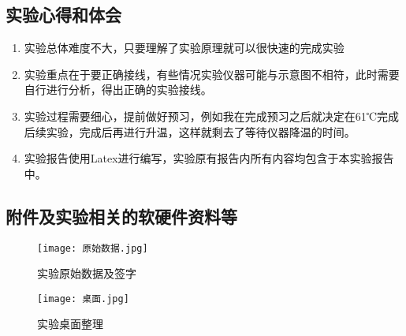 \documentclass[dvipsnames, svgnames,a4paper,11pt]{article}
\begin{document}
	\subsection{实验心得和体会}
	\begin{enumerate}
		\item 实验总体难度不大，只要理解了实验原理就可以很快速的完成实验
		\item 实验重点在于要正确接线，有些情况实验仪器可能与示意图不相符，此时需要自行进行分析，得出正确的实验接线。
		\item 实验过程需要细心，提前做好预习，例如我在完成预习之后就决定在61℃完成后续实验，完成后再进行升温，这样就剩去了等待仪器降温的时间。
		\item 实验报告使用Latex进行编写，实验原有报告内所有内容均包含于本实验报告中。
	\end{enumerate}
	

	\subsection{附件及实验相关的软硬件资料等}
	
	\begin{figure}[{H}]
		\centering
		\texttt{[image: 原始数据.jpg]}
		\caption{实验原始数据及签字}
		\label{}
	\end{figure}
	\begin{figure}[{H}]
		\centering
		\texttt{[image: 桌面.jpg]}
		\caption{实验桌面整理}
		\label{}
	\end{figure}
\end{document}
